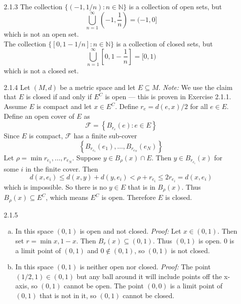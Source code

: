 \documentclass[../../Solutions.tex]{subfiles}
\begin{document}
\begin{itemize}
	\item [2.1.3] The collection $\{(-1,1/n) : n \in \mathbb{N} \}$ is a collection of open sets, but
		$$ \bigcup_{n=1}^\infty \left(-1,\frac{1}{n}\right) = (-1,0] $$
		which is not an open set. \\
		The collection $\{[0,1-1/n] : n \in \mathbb{N} \}$ is a collection of closed sets, but
		$$ \bigcup_{n=1}^\infty \left[0,1-\frac{1}{n}\right] = [0,1) $$
		which is not a closed set.
	
	\item [2.1.4] Let $(M,d)$ be a metric space and let $E \subseteq M$.
		\textit{Note:} We use the claim that $E$ is closed if and only if $E^C$ is open --- this is proven in Exercise 2.1.1. \\
		Assume $E$ is compact and let $x \in E^C$.
		Define $r_e = d(e,x)/2$ for all $e \in E$.
		Define an open cover of $E$ as
		$$ \mathcal{F} = \left\{ B_{r_e}(e) : e \in E \right\} $$
		Since $E$ is compact, $\mathcal{F}$ has a finite sub-cover
		$$ \left\{ B_{r_{e_1}}(e_1), \dots , B_{r_{e_N}}(e_N) \right\} $$
		Let $\rho = \min{r_{e_1}, \dots , r_{e_N}}$.
		Suppose $y \in B_\rho(x) \cap E$. Then $y \in B_{r_{e_i}}(x)$ for some $i$ in the finite cover.
		Then
		$$ d(x,e_i) \leq d(x,y)+d(y,e_i) < \rho + r_{e_i} \leq 2r_{e_i} = d(x,e_i) $$
		which is impossible.
		So there is no $y \in E$ that is in $B_\rho(x)$.
		Thus $B_\rho(x) \subseteq E^C$, which means $E^C$ is open.
		Therefore $E$ is closed.
	
	\item [2.1.5]
	\begin{enumerate}[(a)]
		\item In this space $(0,1)$ is open and not closed.
			\textit{Proof:} Let $x \in (0,1)$.
			Then set $r = \min{x,1-x}$.
			Then $B_r(x) \subseteq (0,1)$.
			Thus $(0,1)$ is open. $0$ is a limit point of $(0,1)$ and $0 \not\in (0,1)$, so $(0,1)$ is not closed.
		\item In this space $(0,1)$ is neither open nor closed.
			\textit{Proof:} The point $(1/2,1) \in (0,1)$ but any ball around it will include points off the x-axis, so $(0,1)$ cannot be open.
			The point $(0,0)$ is a limit point of $(0,1)$ that is not in it, so $(0,1)$ cannot be closed.
	\end{enumerate}
	

\end{itemize}
\end{document}

